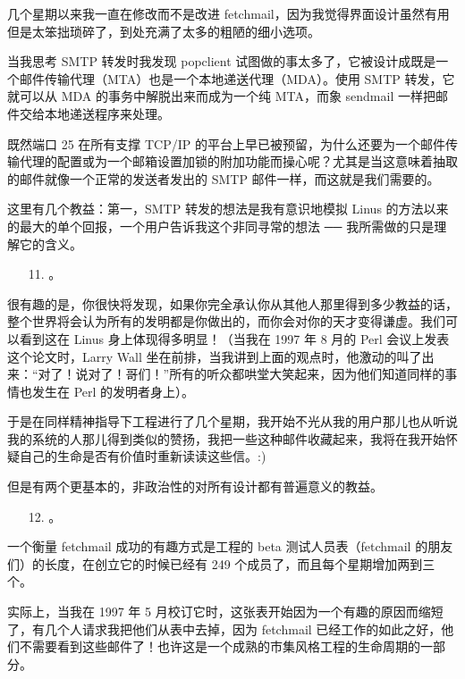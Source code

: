 几个星期以来我一直在修改而不是改进 fetchmail，因为我觉得界面设计虽然有用但是太笨拙琐碎了，到处充满了太多的粗陋的细小选项。


当我思考 SMTP 转发时我发现 popclient 试图做的事太多了，它被设计成既是一个邮件传输代理（MTA）也是一个本地递送代理（MDA）。使用 SMTP 转发，它就可以从 MDA 的事务中解脱出来而成为一个纯 MTA，而象 sendmail 一样把邮件交给本地递送程序来处理。


既然端口 25 在所有支撑 TCP/IP 的平台上早已被预留，为什么还要为一个邮件传输代理的配置或为一个邮箱设置加锁的附加功能而操心呢？尤其是当这意味着抽取的邮件就像一个正常的发送者发出的 SMTP 邮件一样，而这就是我们需要的。


这里有几个教益：第一，SMTP 转发的想法是我有意识地模拟 Linus 的方法以来的最大的单个回报，一个用户告诉我这个非同寻常的想法 ── 我所需做的只是理解它的含义。

\begin{enumerate}
\item[11.] 。
\end{enumerate}

很有趣的是，你很快将发现，如果你完全承认你从其他人那里得到多少教益的话，整个世界将会认为所有的发明都是你做出的，而你会对你的天才变得谦虚。我们可以看到这在 Linus 身上体现得多明显！（当我在 1997 年 8 月的 Perl 会议上发表这个论文时，Larry Wall 坐在前排，当我讲到上面的观点时，他激动的叫了出来：“对了！说对了！哥们！”所有的听众都哄堂大笑起来，因为他们知道同样的事情也发生在 Perl 的发明者身上）。


于是在同样精神指导下工程进行了几个星期，我开始不光从我的用户那儿也从听说我的系统的人那儿得到类似的赞扬，我把一些这种邮件收藏起来，我将在我开始怀疑自己的生命是否有价值时重新读读这些信。:)


但是有两个更基本的，非政治性的对所有设计都有普遍意义的教益。

\begin{enumerate}
\item[12.] 。
\end{enumerate}

一个衡量 fetchmail 成功的有趣方式是工程的 beta 测试人员表（fetchmail 的朋友们）的长度，在创立它的时候已经有 249 个成员了，而且每个星期增加两到三个。


实际上，当我在 1997 年 5 月校订它时，这张表开始因为一个有趣的原因而缩短了，有几个人请求我把他们从表中去掉，因为 fetchmail 已经工作的如此之好，他们不需要看到这些邮件了！也许这是一个成熟的市集风格工程的生命周期的一部分。

